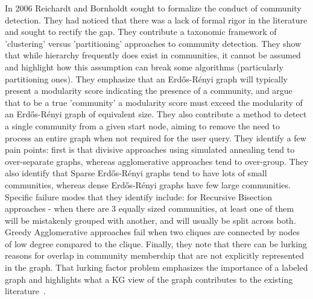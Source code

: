 \par{In 2006 Reichardt and Bornholdt sought to formalize the conduct of community detection. 
They had noticed that there was a lack of formal rigor in the literature and sought to rectify the gap. 
They contribute a taxonomic framework of 'clustering' versus 'partitioning' approaches to community detection. 
They show that while hierarchy frequently does exist in communities, it cannot be assumed and highlight how this assumption can break some algorithms (particularly partitioning ones). 
They emphasize that an Erdős-Rényi graph will typically present a modularity score indicating the presence of a community, and argue that to be a true 'community' a modularity score must exceed the modularity of an Erdős-Rényi graph of equivalent size. 
They also contribute a method to detect a single community from a given start node, aiming to remove the need to process an entire graph when not required for the user query. 
They identify a few pain points: first is that divisive approaches using simulated annealing tend to over-separate graphs, whereas agglomerative approaches tend to over-group. 
They also identify that Sparse Erdős-Rényi graphs tend to have lots of small communities, whereas dense Erdős-Rényi graphs have few large communities. Specific failure modes that they identify include: for Recursive Bisection approaches - when there are 3 equally sized communities, at least one of them will be mistakenly grouped with another, and will usually be split across both. 
Greedy Agglomerative approaches fail when two cliques are connected by nodes of low degree compared to the clique. 
Finally, they note that there can be lurking reasons for overlap in community membership that are not explicitly represented in the graph. 
That lurking factor problem emphasizes the importance of a labeled graph and highlights what a KG view of the graph contributes to the existing literature~\cite{Reichardt2006}.}

